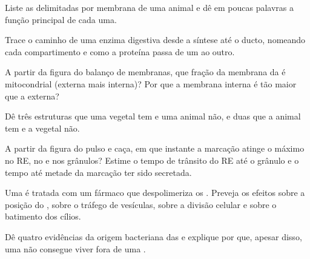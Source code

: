 \begin{exercise}[$\star$]\label{exo:b1:eukaryotic-cell:1}
Liste as  delimitadas por membrana de uma  animal e dê em
poucas palavras a função principal de cada uma.
\end{exercise}

\begin{exercise}[$\star$]\label{exo:b1:eukaryotic-cell:2}
Trace o caminho de uma enzima digestiva desde a síntese até o ducto,
nomeando cada compartimento e como a proteína passa de um ao outro.
\end{exercise}

\begin{exercise}[$\star$]\label{exo:b1:eukaryotic-cell:3}
A partir da figura do balanço de membranas, que fração da membrana da
 é mitocondrial (externa mais interna)? Por que a membrana interna
é tão maior que a externa?
\end{exercise}

\begin{exercise}[$\star$]\label{exo:b1:eukaryotic-cell:4}
Dê três estruturas que uma  vegetal tem e uma  animal não, e
duas que a  animal tem e a vegetal não.
\end{exercise}

\begin{exercise}[$\star\star$]\label{exo:b1:eukaryotic-cell:5}
A partir da figura do pulso e caça, em que instante a marcação atinge o
máximo no RE, no  e nos grânulos? Estime o tempo de trânsito do RE
até o grânulo e o tempo até metade da marcação ter sido secretada.
\end{exercise}

\begin{exercise}[$\star\star$]\label{exo:b1:eukaryotic-cell:6}
Uma  é tratada com um fármaco que despolimeriza os .
Preveja os efeitos sobre a posição do , sobre o tráfego de
vesículas, sobre a divisão celular e sobre o batimento dos cílios.
\end{exercise}

\begin{exercise}[$\star\star$]\label{exo:b1:eukaryotic-cell:7}
Dê quatro evidências da origem bacteriana das  e explique
por que, apesar disso, uma  não consegue viver fora de uma
.
\end{exercise}


